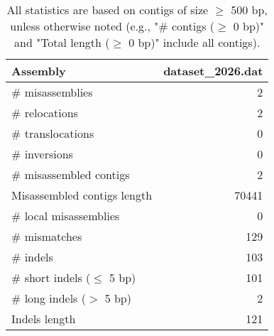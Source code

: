 \documentclass[12pt,a4paper]{article}
\begin{document}
\begin{table}[ht]
\begin{center}
\caption{All statistics are based on contigs of size $\geq$ 500 bp, unless otherwise noted (e.g., "\# contigs ($\geq$ 0 bp)" and "Total length ($\geq$ 0 bp)" include all contigs).}
\begin{tabular}{|l*{1}{|r}|}
\hline
Assembly & dataset\_2026.dat \\ \hline
\# misassemblies & 2 \\ \hline
\hspace{5mm}\# relocations & 2 \\ \hline
\hspace{5mm}\# translocations & 0 \\ \hline
\hspace{5mm}\# inversions & 0 \\ \hline
\# misassembled contigs & 2 \\ \hline
Misassembled contigs length & 70441 \\ \hline
\# local misassemblies & 0 \\ \hline
\# mismatches & 129 \\ \hline
\# indels & 103 \\ \hline
\hspace{5mm}\# short indels ($\leq$ 5 bp) & 101 \\ \hline
\hspace{5mm}\# long indels ($>$ 5 bp) & 2 \\ \hline
Indels length & 121 \\ \hline
\end{tabular}
\end{center}
\end{table}
\end{document}
